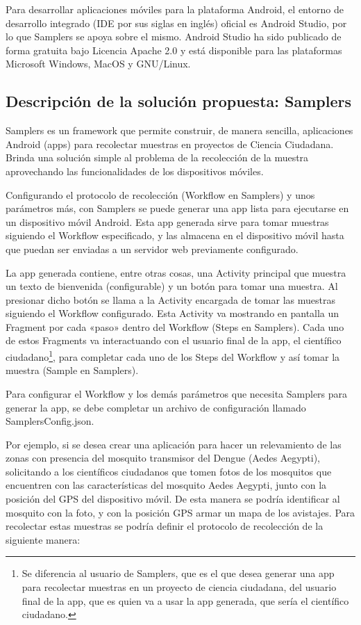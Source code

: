 Para desarrollar aplicaciones móviles para la plataforma Android, el entorno de desarrollo integrado (IDE por sus siglas en inglés) oficial es Android Studio\cite{androidStudio}, por lo que Samplers se apoya sobre el mismo. Android Studio ha sido publicado de forma gratuita bajo Licencia Apache 2.0 y está disponible para las plataformas Microsoft Windows, MacOS y GNU/Linux.

\subsection{Descripción de la solución propuesta: Samplers}
Samplers es un framework que permite construir, de manera sencilla, aplicaciones Android (apps) para recolectar muestras en proyectos de Ciencia Ciudadana. Brinda una solución simple al problema de la recolección de la muestra aprovechando las funcionalidades de los dispositivos móviles.

Configurando el protocolo de recolección (Workflow en Samplers) y unos parámetros más, con Samplers se puede generar una app lista para ejecutarse en un dispositivo móvil Android. Esta app generada sirve para tomar muestras siguiendo el Workflow especificado, y las almacena en el dispositivo móvil hasta que puedan ser enviadas a un servidor web previamente configurado.

La app generada contiene, entre otras cosas, una Activity principal que muestra un texto de bienvenida (configurable) y un botón para tomar una muestra. Al presionar dicho botón se llama a la Activity encargada de tomar las muestras siguiendo el Workflow configurado. Esta Activity va mostrando en pantalla un Fragment por cada «paso» dentro del Workflow (Steps en Samplers). Cada uno de estos Fragments va interactuando con el usuario final de la app, el científico ciudadano\footnote{Se diferencia al usuario de Samplers, que es el que desea generar una app para recolectar muestras en un proyecto de ciencia ciudadana, del usuario final de la app, que es quien va a usar la app generada, que sería el científico ciudadano.}, para completar cada uno de los Steps del Workflow y así tomar la muestra (Sample en Samplers).

Para configurar el Workflow y los demás parámetros que necesita Samplers para generar la app, se debe completar un archivo de configuración llamado SamplersConfig.json.

Por ejemplo, si se desea crear una aplicación para hacer un relevamiento de las zonas con presencia del mosquito transmisor del Dengue (Aedes Aegypti), solicitando a los científicos ciudadanos que tomen fotos de los mosquitos que encuentren con las características del mosquito Aedes Aegypti, junto con la posición del GPS del dispositivo móvil. De esta manera se podría identificar al mosquito con la foto, y con la posición GPS armar un mapa de los avistajes. Para recolectar estas muestras se podría definir el protocolo de recolección de la siguiente manera:

